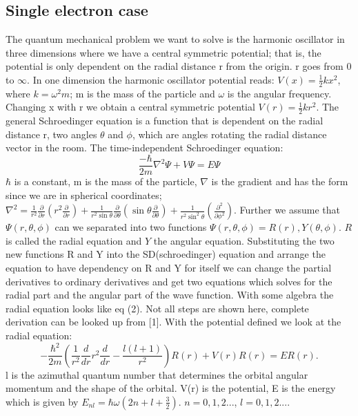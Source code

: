 \documentclass[twocolumn]{article}
\begin{document}
\subsection*{Single electron case}
The quantum mechanical problem we want to solve is the harmonic oscillator in three dimensions where we have a central symmetric potential; that is, the potential is only dependent on the radial distance r from the origin. r goes from 0 to $\infty$. In one dimension the harmonic oscillator potential reads: $V(x) = \frac{1}{2}k x^2 $, where $k = \omega^2 m$; m is the mass of the particle and $\omega$ is the angular frequency. Changing x with r we obtain a central symmetric potential $V(r) = \frac{1}{2}kr^2$. The general Schroedinger equation is a function that is dependent on the radial distance r, two angles $\theta$ and $\phi$, which are angles rotating the radial distance vector in the room. 
\newline
The time-independent Schroedinger equation:
\begin{equation}
    \frac{-\hbar}{2m}\nabla^2\Psi + V\Psi = E\Psi
\end{equation}
$\hbar$ is a constant, m is the mass of the particle, $\nabla$ is the gradient and has the form since we are in spherical coordinates; 
\newline
$\nabla^2 = \frac{1}{r^2}\frac{\partial}{\partial r} (r^2\frac{\partial}{\partial r}) + \frac{1}{r^2\sin\theta}\frac{\partial}{\partial \theta}(\sin\theta \frac{\partial}{\partial \theta} ) + \frac{1}{r^2\sin^2\theta}(\frac{\partial^2}{\partial\phi^2 })$. 
\newline
Further we assume that $\Psi(r, \theta, \phi)$ can we separated into two functions $\Psi(r, \theta, \phi) = R(r), Y(\theta, \phi)$. $R$ is called the radial equation and $Y$ the angular equation. Substituting the two new functions R and Y into the SD(schroedinger) equation and arrange the equation to have dependency on R and Y for itself we can change the partial derivatives to ordinary derivatives and get two equations which solves for the radial part and the angular part of the wave function. With some algebra the radial equation looks like eq (2). Not all steps are shown here, complete derivation can be looked up from [1].
\newline
With the potential defined we look at the radial equation:
\begin{equation}
    -\frac{\hbar^2}{2 m} \left ( \frac{1}{r^2} \frac{d}{dr} r^2
    \frac{d}{dr} - \frac{l (l + 1)}{r^2} \right )R(r) 
    + V(r) R(r) = E R(r).
\end{equation}
l is the azimuthal quantum number that determines the orbital angular momentum and the shape of the orbital. V(r) is the potential, E is the energy which is given by $E_{nl}=  \hbar \omega \left(2n+l+\frac{3}{2}\right)$. $n = 0, 1, 2...$, $l = 0, 1, 2...$. 
\newline
\end{document}
